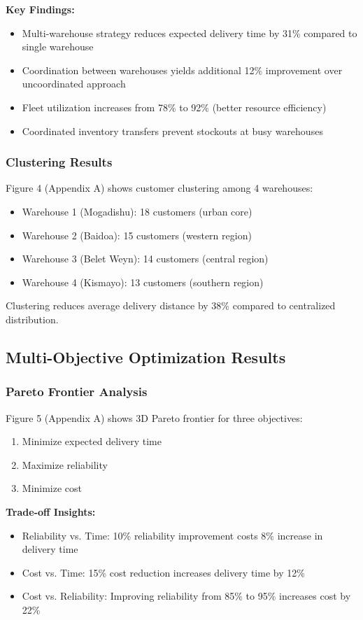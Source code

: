 \textbf{Key Findings:}
\begin{itemize}
\item Multi-warehouse strategy reduces expected delivery time by 31\% compared to single warehouse
\item Coordination between warehouses yields additional 12\% improvement over uncoordinated approach
\item Fleet utilization increases from 78\% to 92\% (better resource efficiency)
\item Coordinated inventory transfers prevent stockouts at busy warehouses
\end{itemize}

\subsubsection{Clustering Results}

Figure 4 (Appendix A) shows customer clustering among 4 warehouses:
\begin{itemize}
\item Warehouse 1 (Mogadishu): 18 customers (urban core)
\item Warehouse 2 (Baidoa): 15 customers (western region)
\item Warehouse 3 (Belet Weyn): 14 customers (central region)
\item Warehouse 4 (Kismayo): 13 customers (southern region)
\end{itemize}

Clustering reduces average delivery distance by 38\% compared to centralized distribution.

\subsection{Multi-Objective Optimization Results}

\subsubsection{Pareto Frontier Analysis}

Figure 5 (Appendix A) shows 3D Pareto frontier for three objectives:
\begin{enumerate}
\item Minimize expected delivery time
\item Maximize reliability
\item Minimize cost
\end{enumerate}

\textbf{Trade-off Insights:}
\begin{itemize}
\item Reliability vs. Time: 10\% reliability improvement costs 8\% increase in delivery time
\item Cost vs. Time: 15\% cost reduction increases delivery time by 12\%
\item Cost vs. Reliability: Improving reliability from 85\% to 95\% increases cost by 22\%
\end{itemize}

